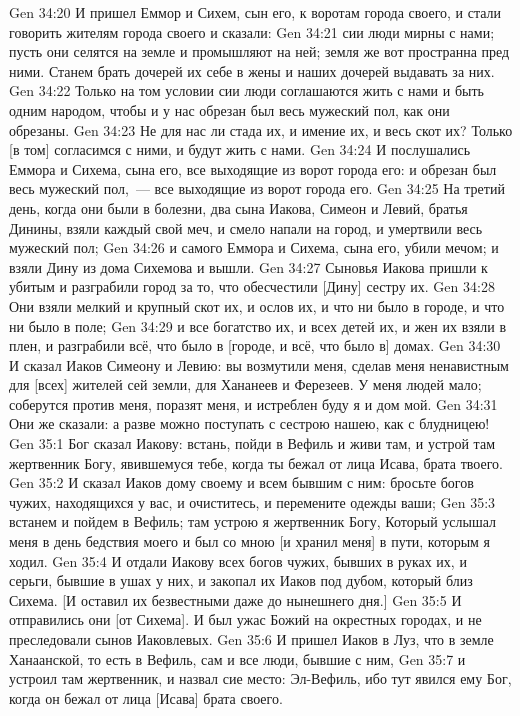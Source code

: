 \vs Gen 34:20 И пришел Еммор и Сихем, сын его, к воротам города своего, и стали говорить жителям города своего и сказали:
\vs Gen 34:21 сии люди мирны с нами; пусть они селятся на земле и промышляют на ней; земля же вот пространна пред ними. Станем брать дочерей их себе в жены и наших дочерей выдавать за них.
\vs Gen 34:22 Только на том условии сии люди соглашаются жить с нами и быть одним народом, чтобы и у нас обрезан был весь мужеский пол, как они обрезаны.
\vs Gen 34:23 Не для нас ли стада их, и имение их, и весь скот их? Только [в том] согласимся с ними, и будут жить с нами.
\vs Gen 34:24 И послушались Еммора и Сихема, сына его, все выходящие из ворот города его: и обрезан был весь мужеский пол,~--- все выходящие из ворот города его.
\vs Gen 34:25 На третий день, когда они были в болезни, два сына Иакова, Симеон и Левий, братья Динины, взяли каждый свой меч, и смело напали на город, и умертвили весь мужеский пол;
\vs Gen 34:26 и самого Еммора и Сихема, сына его, убили мечом; и взяли Дину из дома Сихемова и вышли.
\vs Gen 34:27 Сыновья Иакова пришли к убитым и разграбили город за то, что обесчестили [Дину] сестру их.
\vs Gen 34:28 Они взяли мелкий и крупный скот их, и ослов их, и что ни было в городе, и что ни было в поле;
\vs Gen 34:29 и все богатство их, и всех детей их, и жен их взяли в плен, и разграбили всё, что было в [городе, и всё, что было в] домах.
\vs Gen 34:30 И сказал Иаков Симеону и Левию: вы возмутили меня, сделав меня ненавистным для [всех] жителей сей земли, для Хананеев и Ферезеев. У меня людей мало; соберутся против меня, поразят меня, и истреблен буду я и дом мой.
\vs Gen 34:31 Они же сказали: а разве можно поступать с сестрою нашею, как с блудницею!
\vs Gen 35:1 Бог сказал Иакову: встань, пойди в Вефиль и живи там, и устрой там жертвенник Богу, явившемуся тебе, когда ты бежал от лица Исава, брата твоего.
\vs Gen 35:2 И сказал Иаков дому своему и всем бывшим с ним: бросьте богов чужих, находящихся у вас, и очиститесь, и перемените одежды ваши;
\vs Gen 35:3 встанем и пойдем в Вефиль; там устрою я жертвенник Богу, Который услышал меня в день бедствия моего и был со мною [и хранил меня] в пути, которым я ходил.
\vs Gen 35:4 И отдали Иакову всех богов чужих, бывших в руках их, и серьги, бывшие в ушах у них, и закопал их Иаков под дубом, который близ Сихема. [И оставил их безвестными даже до нынешнего дня.]
\vs Gen 35:5 И отправились они [от Сихема]. И был ужас Божий на окрестных городах, и не преследовали сынов Иаковлевых.
\vs Gen 35:6 И пришел Иаков в Луз, что в земле Ханаанской, то есть в Вефиль, сам и все люди, бывшие с ним,
\vs Gen 35:7 и устроил там жертвенник, и назвал сие место: Эл-Вефиль, ибо тут явился ему Бог, когда он бежал от лица [Исава] брата своего.
